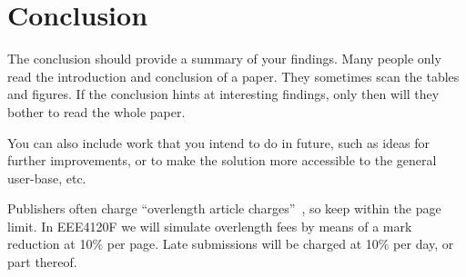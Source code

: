 \section{Conclusion}

The conclusion should provide a summary of your findings.  Many people only read the introduction and conclusion of a paper.  They sometimes scan the tables and figures.  If the conclusion hints at interesting findings, only then will they bother to read the whole paper.

You can also include work that you intend to do in future, such as ideas for further improvements, or to make the solution more accessible to the general user-base, etc.

Publishers often charge ``overlength article charges''~\cite{Overlength_Fee}, so keep within the page limit.  In EEE4120F we will simulate overlength fees by means of a mark reduction at 10\% per page.  Late submissions will be charged at 10\% per day, or part thereof.
